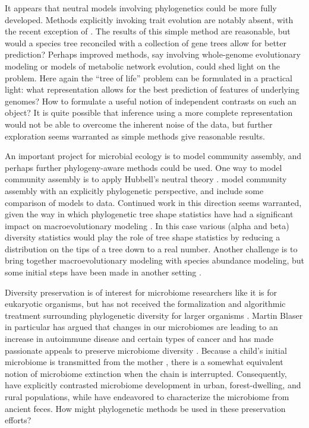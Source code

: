 \documentclass{amsart}
\begin{document}
It appears that neutral models involving phylogenetics could be more fully developed.
Methods explicitly invoking trait evolution are notably absent, with the recent exception of \citep{langille2013predictive}.
The results of this simple method are reasonable, but would a species tree reconciled with a collection of gene trees allow for better prediction?
Perhaps improved methods, say involving whole-genome evolutionary modeling or models of metabolic network evolution, could shed light on the problem.
Here again the ``tree of life'' problem can be formulated in a practical light: what representation allows for the best prediction of features of underlying genomes?
How to formulate a useful notion of independent contrasts \citep{felsenstein1985phylogenies} on such an object?
It is quite possible that inference using a more complete representation would not be able to overcome the inherent noise of the data, but further exploration seems warranted as simple methods give reasonable results.

An important project for microbial ecology is to model community assembly, and perhaps further phylogeny-aware methods could be used.
One way to model community assembly is to apply Hubbell's neutral theory \citep{fierer2012animalcules,costello2012application}.
\citet{o2012phylogenetic} model community assembly with an explicitly phylogenetic perspective, and include some comparison of models to data.
Continued work in this direction seems warranted, given the way in which phylogenetic tree shape statistics have had a significant impact on macroevolutionary modeling \citep{mooers1997inferring,aldous2011five}.
In this case various (alpha and beta) diversity statistics would play the role of tree shape statistics by reducing a distribution on the tips of a tree down to a real number.
Another challenge is to bring together macroevolutionary modeling with species abundance modeling, but some initial steps have been made in another setting \citep{lambert2013predicting}.

Diversity preservation is of interest for microbiome researchers like it is for eukaryotic organisms, but has not received the formalization and algorithmic treatment surrounding phylogenetic diversity for larger organisms \citep{hartmann2006maximizing,pardi2007resource}.
Martin Blaser in particular has argued that changes in our microbiomes are leading to an increase in autoimmune disease and certain types of cancer \citep[reviewed in][]{cho2012human} and has made passionate appeals to preserve microbiome diversity \citep{blaser2011antibiotic}.
Because a child's initial microbiome is transmitted from the mother \citep[reviewed in][]{funkhouser2013mom}, there is a somewhat equivalent notion of microbiome extinction when the chain is interrupted.
Consequently, \citet{yatsunenko2012human} have explicitly contrasted microbiome development in urban, forest-dwelling, and rural populations, while \citet{tito2012insights} have endeavored to characterize the microbiome from ancient feces.
How might phylogenetic methods be used in these preservation efforts?
\end{document}
